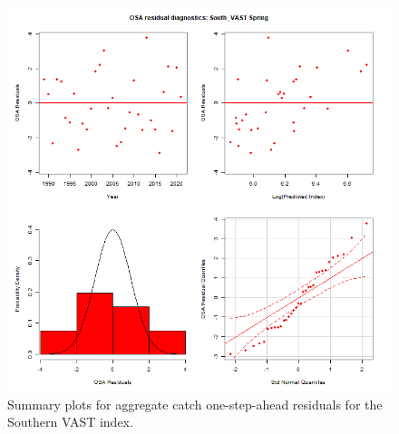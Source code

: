 \documentclass[
]{article}
\begin{document}
\begin{figure}

{\centering \includegraphics[width=1\linewidth]{../2023.RT.Runs/Run34/plots_png/diagnostics/OSA_resid_catch_4panel_South_VAST_Spring} 

}

\caption{Summary plots for aggregate catch one-step-ahead residuals for the Southern VAST index.}\label{fig:osa-South-vast-catch-summ}
\end{figure}
\end{document}

